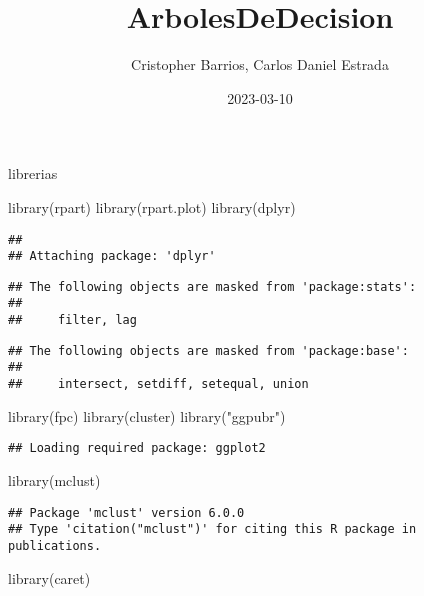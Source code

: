 \documentclass[
]{article}
\title{ArbolesDeDecision}
\author{Cristopher Barrios, Carlos Daniel Estrada}
\date{2023-03-10}
\newenvironment{Shaded}{\begin{snugshade}}{\end{snugshade}}
\newcommand{\FunctionTok}[1]{\textcolor[rgb]{0.00,0.00,0.00}{#1}}
\newcommand{\NormalTok}[1]{#1}
\newcommand{\StringTok}[1]{\textcolor[rgb]{0.31,0.60,0.02}{#1}}
\begin{document}
\maketitle

librerias

\begin{Shaded}
\begin{Highlighting}[]
\FunctionTok{library}\NormalTok{(rpart)}
\FunctionTok{library}\NormalTok{(rpart.plot)}
\FunctionTok{library}\NormalTok{(dplyr) }
\end{Highlighting}
\end{Shaded}

\begin{verbatim}
## 
## Attaching package: 'dplyr'
\end{verbatim}

\begin{verbatim}
## The following objects are masked from 'package:stats':
## 
##     filter, lag
\end{verbatim}

\begin{verbatim}
## The following objects are masked from 'package:base':
## 
##     intersect, setdiff, setequal, union
\end{verbatim}

\begin{Shaded}
\begin{Highlighting}[]
\FunctionTok{library}\NormalTok{(fpc) }
\FunctionTok{library}\NormalTok{(cluster) }
\FunctionTok{library}\NormalTok{(}\StringTok{"ggpubr"}\NormalTok{) }
\end{Highlighting}
\end{Shaded}

\begin{verbatim}
## Loading required package: ggplot2
\end{verbatim}

\begin{Shaded}
\begin{Highlighting}[]
\FunctionTok{library}\NormalTok{(mclust)}
\end{Highlighting}
\end{Shaded}

\begin{verbatim}
## Package 'mclust' version 6.0.0
## Type 'citation("mclust")' for citing this R package in publications.
\end{verbatim}

\begin{Shaded}
\begin{Highlighting}[]
\FunctionTok{library}\NormalTok{(caret)}
\end{Highlighting}
\end{Shaded}
\end{document}
